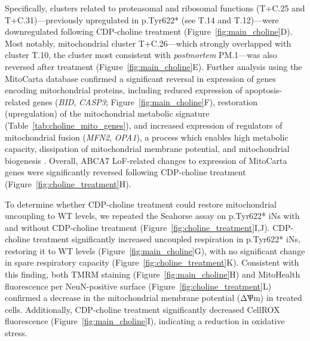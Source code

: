 Specifically, clusters related to proteasomal and ribosomal functions (T+C.25 and T+C.31)—previously upregulated in p.Tyr622* (see T.14 and T.12)—were downregulated following CDP-choline treatment (Figure~\ref{fig:main_choline}D). Most notably, mitochondrial cluster T+C.26—which strongly overlapped with cluster T.10, the cluster most consistent with \textit{postmortem} PM.1—was also reversed after treatment (Figure~\ref{fig:main_choline}E). Further analysis using the MitoCarta database confirmed a significant reversal in expression of genes encoding mitochondrial proteins, including reduced expression of apoptosis-related genes (\textit{BID}, \textit{CASP3}; Figure~\ref{fig:main_choline}F), restoration (upregulation) of the mitochondrial metabolic signature (Table~\ref{tab:choline_mito_genes}), and increased expression of regulators of mitochondrial fusion (\textit{MFN2}, \textit{OPA1}), a process which enables high metabolic capacity, dissipation of mitochondrial membrane potential, and mitochondrial biogenesis \cite{Westermann2010-au}. Overall, ABCA7 LoF-related changes to expression of MitoCarta genes were significantly reversed following CDP-choline treatment (Figure~\ref{fig:choline_treatment}H). 

To determine whether CDP-choline treatment could restore mitochondrial uncoupling to WT levels, we repeated the Seahorse assay on p.Tyr622* iNs with and without CDP-choline treatment (Figure~\ref{fig:choline_treatment}I,J). CDP-choline treatment significantly increased uncoupled respiration in p.Tyr622* iNs, restoring it to WT levels (Figure~\ref{fig:main_choline}G), with no significant change in spare respiratory capacity (Figure~\ref{fig:choline_treatment}K). Consistent with this finding, both TMRM staining (Figure~\ref{fig:main_choline}H) and MitoHealth fluorescence per NeuN-positive surface (Figure~\ref{fig:choline_treatment}L) confirmed a decrease in the mitochondrial membrane potential (ΔѰm) in treated cells. Additionally, CDP-choline treatment significantly decreased CellROX fluorescence (Figure~\ref{fig:main_choline}I), indicating a reduction in oxidative stress. 

